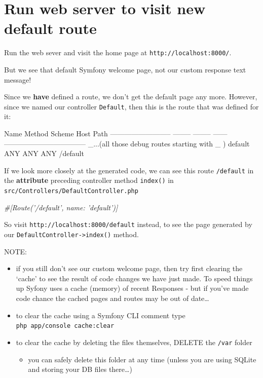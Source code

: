 \documentclass[a4paperpaper,openright]{book}
\newenvironment{Shaded}{}{}
\newcommand{\CommentTok}[1]{\textcolor[rgb]{0.38,0.63,0.69}{\textit{#1}}}
\newcommand{\ExtensionTok}[1]{#1}
\newcommand{\NormalTok}[1]{#1}
\providecommand{\tightlist}{%
  \setlength{\itemsep}{0pt}\setlength{\parskip}{0pt}}
\begin{document}
\hypertarget{run-web-server-to-visit-new-default-route}{%
\section{Run web server to visit new default
route}\label{run-web-server-to-visit-new-default-route}}

Run the web sever and visit the home page at
\texttt{http://localhost:8000/}.

But we see that default Symfony welcome page, not our custom response
text message!

Since we \textbf{have} defined a route, we don't get the default page
any more. However, since we named our controller \texttt{Default}, then
this is the route that was defined for it:

\begin{Shaded}
\begin{Highlighting}[]
  \ExtensionTok{Name}\NormalTok{                       Method   Scheme   Host   Path}
 \ExtensionTok{--------------------------}\NormalTok{ -------- -------- ------ -----------------------------------}
  \ExtensionTok{_...}\NormalTok{(all those debug routes starting with _ )}
  \ExtensionTok{default}\NormalTok{                    ANY      ANY      ANY    /default}
\end{Highlighting}
\end{Shaded}

If we look more closely at the generated code, we can see this route
\texttt{/default} in the \textbf{attribute} preceding controller method
\texttt{index()} in \texttt{src/Controllers/DefaultController.php}

\begin{Shaded}
\begin{Highlighting}[]
    \CommentTok{#[Route('/default', name: 'default')]}
\end{Highlighting}
\end{Shaded}

So visit \texttt{http://localhost:8000/default} instead, to see the page
generated by our \texttt{DefaultController-\textgreater{}index()}
method.

NOTE:

\begin{itemize}
\item
  if you still don't see our custom welcome page, then try first
  clearing the `cache' to see the result of code changes we have just
  made. To speed things up Syfony uses a cache (memory) of recent
  Responses - but if you've made code chance the cached pages and routes
  may be out of date\ldots{}
\item
  to clear the cache using a Symfony CLI comment type
  \texttt{php\ app/console\ cache:clear}
\item
  to clear the cache by deleting the files themselves, DELETE the
  \texttt{/var} folder

  \begin{itemize}
  \tightlist
  \item
    you can safely delete this folder at any time (unless you are using
    SQLite and storing your DB files there\ldots{})
  \end{itemize}
\end{itemize}
\end{document}

